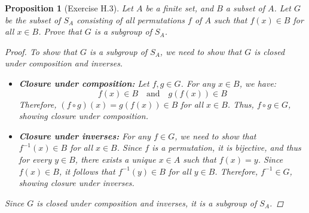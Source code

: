 \documentclass[12pt]{article}
\newtheorem{proposition}{Proposition}
\begin{document}
\begin{proposition}[Exercise H.3]
  Let $A$ be a finite set, and $B$ a subset of $A$.
  Let $G$ be the subset of $S_A$ consisting of all permutations $f$ of $A$ such that $f(x) \in B$ for all $x \in B$.
  Prove that $G$ is a subgroup of $S_A$.
  \begin{proof}
    To show that $G$ is a subgroup of $S_A$, we need to show that $G$ is closed under composition and inverses.
    \begin{itemize}
      \item \textbf{Closure under composition:} Let $f, g \in G$.
            For any $x \in B$, we have:
            \[
              f(x) \in B \quad \text{and} \quad g(f(x)) \in B
            \]
            Therefore, $(f \circ g)(x) = g(f(x)) \in B$ for all $x \in B$.
            Thus, $f \circ g \in G$, showing closure under composition.

      \item \textbf{Closure under inverses:} For any $f \in G$, we need to show that $f^{-1}(x) \in B$ for all $x \in B$.
            Since $f$ is a permutation, it is bijective, and thus for every $y \in B$, there exists a unique $x \in A$ such that $f(x) = y$.
            Since $f(x) \in B$, it follows that $f^{-1}(y) \in B$ for all $y \in B$.
            Therefore, $f^{-1} \in G$, showing closure under inverses.
    \end{itemize}
    Since $G$ is closed under composition and inverses, it is a subgroup of $S_A$.
  \end{proof}
\end{proposition}


\end{document}
